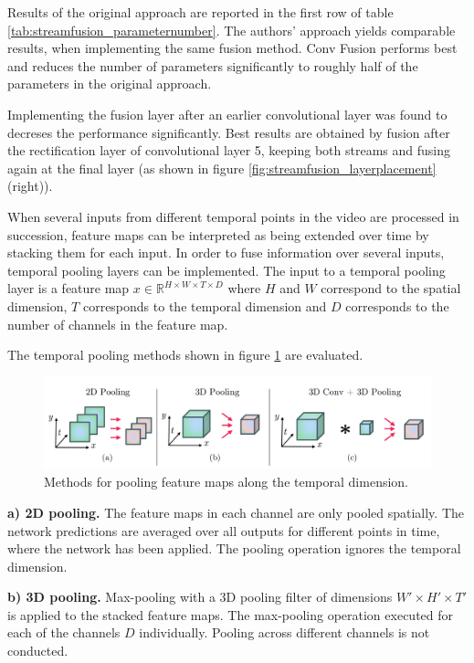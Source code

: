 Results of the original approach are reported in the first row of table \ref{tab:streamfusion_parameternumber}.
The authors' approach yields comparable results, when implementing the same fusion method.
Conv Fusion performs best and reduces the number of parameters significantly to roughly half of the parameters in the original approach.

Implementing the fusion layer after an earlier convolutional layer was found to decreses the performance significantly.
Best results are obtained by fusion after the rectification layer of convolutional layer 5, keeping both streams and fusing again at the final layer (as shown in figure \ref{fig:streamfusion_layerplacement} (right)).

When several inputs from different temporal points in the video are processed in succession, feature maps can be interpreted as being extended over time by stacking them for each input.
In order to fuse information over several inputs, temporal pooling layers can be implemented.
The input to a temporal pooling layer is a feature map $x \in \mathbb{R}^{H \times W \times T \times D}$ where $H$ and $W$ correspond to the spatial dimension, $T$ corresponds to the temporal dimension and $D$ corresponds to the number of channels in the feature map.

The temporal pooling methods shown in figure \ref{fig:streamfusion_temppooling} are evaluated.

\begin{figure}[H]
    \centering
    \includegraphics[width=\textwidth]{img_deep/streamfusion_temppooling}
\caption{Methods for pooling feature maps along the temporal dimension. \cite{feichtenhofer_convolutional_2016}}
    \label{fig:streamfusion_temppooling}
\end{figure}

\textbf{a) 2D pooling.}
The feature maps in each channel are only pooled spatially.
The network predictions are averaged over all outputs for different points in time, where the network has been applied.
The pooling operation ignores the temporal dimension.

\textbf{b) 3D pooling.}
Max-pooling with a 3D pooling filter of dimensions $W' \times H' \times T'$ is applied to the stacked feature maps.
The max-pooling operation executed for each of the channels $D$ individually.
Pooling across different channels is not conducted.

